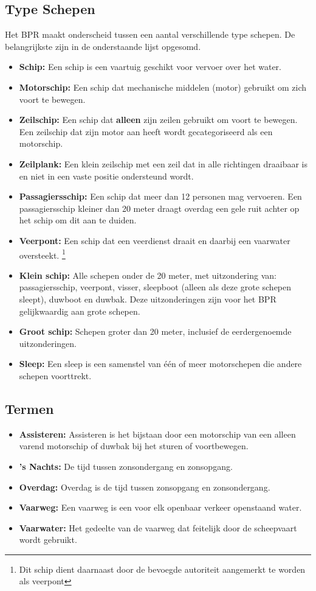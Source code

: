 \subsection{Type Schepen}
Het BPR maakt onderscheid tussen een aantal verschillende type schepen. De belangrijkste zijn in de onderstaande lijst opgesomd.
\begin{itemize}
	\item \textbf{Schip:} Een schip is een vaartuig geschikt voor vervoer over het water.
    \item \textbf{Motorschip:} Een schip dat mechanische middelen (motor) gebruikt om zich voort te bewegen.
    \item \textbf{Zeilschip:} Een schip dat \textbf{alleen} zijn zeilen gebruikt om voort te bewegen. Een zeilschip dat zijn motor aan heeft wordt gecategoriseerd als een motorschip.
    \item \textbf{Zeilplank:} Een klein zeilschip met een zeil dat in alle richtingen draaibaar is en niet in een vaste positie ondersteund wordt.
    \item \textbf{Passagiersschip:} Een schip dat meer dan 12 personen mag vervoeren. Een passagiersschip kleiner dan 20 meter draagt overdag een gele ruit achter op het schip om dit aan te duiden. 
    \item \textbf{Veerpont:} Een schip dat een veerdienst draait en daarbij een vaarwater oversteekt. \footnote{Dit schip dient daarnaast door de bevoegde autoriteit aangemerkt te worden als veerpont}
    \item \textbf{Klein schip:} Alle schepen onder de 20 meter, met uitzondering van: passagiersschip, veerpont, visser, sleepboot
(alleen als deze grote schepen sleept), duwboot en duwbak. Deze uitzonderingen zijn voor het BPR gelijkwaardig aan grote schepen. 
    \item \textbf{Groot schip:} Schepen groter dan 20 meter, inclusief de eerdergenoemde uitzonderingen. 
    \item \textbf{Sleep:} Een sleep is een samenstel van één of meer motorschepen die andere schepen voorttrekt. 
\end{itemize}

\newpage
\subsection{Termen}
	\begin{itemize}
		\item \textbf{Assisteren:} Assisteren is het bijstaan door een motorschip van een alleen varend motorschip of duwbak bij het sturen of voortbewegen.
		\item \textbf{'s Nachts:} De tijd tussen zonsondergang en zonsopgang.
		\item \textbf{Overdag:} Overdag is de tijd tussen zonsopgang en zonsondergang.
		\item \textbf{Vaarweg:} Een vaarweg is een voor elk openbaar verkeer openstaand water.
		\item \textbf{Vaarwater:} Het gedeelte van de vaarweg dat feitelijk door de scheepvaart wordt gebruikt.
	\end{itemize}

